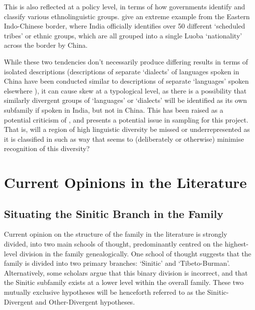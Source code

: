 This is also reflected at a policy level, in terms of how governments identify and classify various ethnolinguistic groups.  give an extreme example from the Eastern Indo-Chinese border, where India officially identifies over 50 different `scheduled tribes' or ethnic groups, which are all grouped into a single Luoba `nationality' across the border by China.

While these two tendencies don't necessarily produce differing results in terms of isolated descriptions (descriptions of separate `dialects' of languages spoken in China have been conducted similar to descriptions of separate `languages' spoken elsewhere \cites{Lai2017}{TaylorAdams2020}), it can cause skew at a typological level, as there is a possibility that similarly divergent groups of `languages' or `dialects' will be identified as its own subfamily if spoken in India, but not in China. This has been raised as a potential criticism of  \cite{LaPolla2016}, and presents a potential issue in sampling for this project. That is, will a region of high linguistic diversity be missed or underrepresented as it is classified in such as way that seems to (deliberately or otherwise) minimise recognition of this diversity?


\section{Current Opinions in the Literature}
\subsection{Situating the Sinitic Branch in the Family}\label{ss:THOverview:HighLevelStructure}

Current opinion on the structure of the family in the literature is strongly divided, into two main schools of thought, predominantly centred on the highest-level division in the family genealogically. One school of thought suggests that the family is divided into two primary branches: `Sinitic' and `Tibeto-Burman'. Alternatively, some scholars argue that this binary division is incorrect, and that the Sinitic subfamily exists at a lower level within the overall family. These two mutually exclusive hypotheses will be henceforth referred to as the Sinitic-Divergent and Other-Divergent hypotheses.


